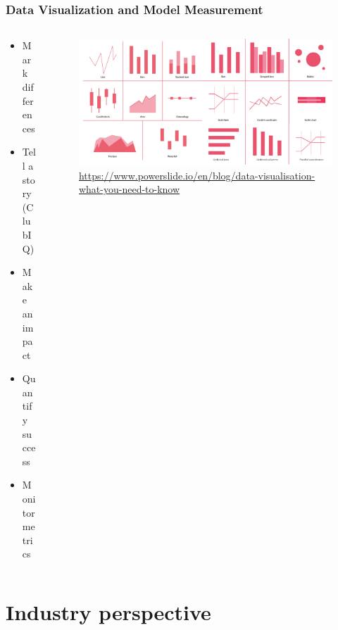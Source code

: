 \documentclass[aspectratio=169,xcolor=x11names,table]{beamer}
\begin{document}
\begin{frame}
	\frametitle{Data Visualization and Model Measurement}
	\begin{columns}
		\begin{column}{0.3\linewidth}
			\begin{itemize}
				\item Mark differences
					\vspace{5mm}
				\item Tell a story (ClubIQ)
					\vspace{5mm}
				\item Make an impact
					\vspace{5mm}
				\item Quantify success
					\vspace{5mm}
				\item Monitor metrics
			\end{itemize}
		\end{column}
		\hfill
		\begin{column}{0.7\linewidth}
			\begin{figure}
				\centering
				\includegraphics[width=\columnwidth]{data_visualization}
				\tiny \url{https://www.powerslide.io/en/blog/data-visualisation-what-you-need-to-know}
			\end{figure}
		\end{column}
	\end{columns}
\end{frame}


\section{Industry perspective}
\end{document}
